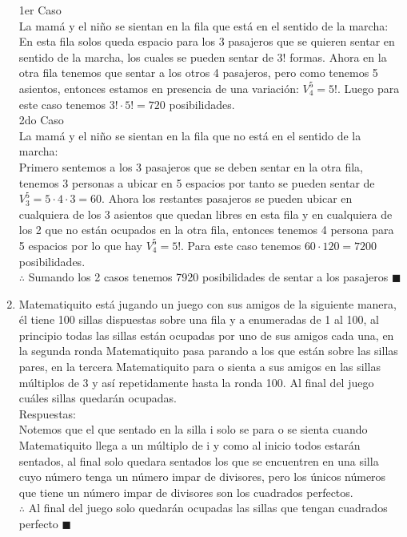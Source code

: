 \documentclass{book}
\begin{document}
\begin{enumerate}
          1er Caso\\
          La mamá y el niño se sientan en la fila que está en el sentido de la marcha:\\
          En esta fila solos queda espacio para los 3 pasajeros que se quieren sentar en sentido de la marcha, los cuales se pueden sentar de 3! formas. Ahora en la otra fila tenemos que sentar a los otros 4 pasajeros, pero como tenemos 5 asientos, entonces estamos en presencia de una variación: $V_{4}^{5}=5!$. Luego para este caso tenemos $3!\cdot 5!=720$ posibilidades.\\
          2do Caso\\
          La mamá y el niño se sientan en la fila que no está en el sentido de la marcha:\\
          Primero sentemos a los 3 pasajeros que se deben sentar en la otra fila, tenemos 3 personas a ubicar en 5 espacios por tanto se pueden sentar de $V_{3}^{5}=5\cdot 4\cdot 3=60$. Ahora los restantes pasajeros se pueden ubicar en cualquiera de los 3 asientos que quedan libres en esta fila y en cualquiera de los 2 que no están ocupados en la otra fila, entonces tenemos 4 persona para 5 espacios por lo que hay $V_{4}^{5}=5!$. Para este caso tenemos $60\cdot 120=7200$ posibilidades.\\
          $\therefore$ Sumando los 2 casos tenemos 7920 posibilidades de sentar a los pasajeros $\blacksquare$\\
    \item Matematiquito está jugando un juego con sus amigos de la siguiente manera, él tiene 100 sillas dispuestas sobre una fila y a enumeradas de 1 al 100, al principio todas las sillas están ocupadas por uno de sus amigos cada una, en la segunda ronda Matematiquito pasa parando a los que están sobre las sillas pares, en la tercera Matematiquito para o sienta a sus amigos en las sillas múltiplos de 3 y así repetidamente hasta la ronda 100. Al final del juego cuáles sillas quedarán ocupadas.\\
          Respuestas:\\
          Notemos que el que sentado en la silla i solo se para o se sienta cuando Matematiquito llega a un múltiplo de i y como al inicio todos estarán sentados, al final solo quedara sentados los que se encuentren en una silla cuyo número tenga un número impar de divisores, pero los únicos números que tiene un número impar de divisores son los cuadrados perfectos.\\
          $\therefore$ Al final del juego solo quedarán ocupadas las sillas que tengan cuadrados perfecto $\blacksquare$\\

\end{enumerate}
\end{document}
